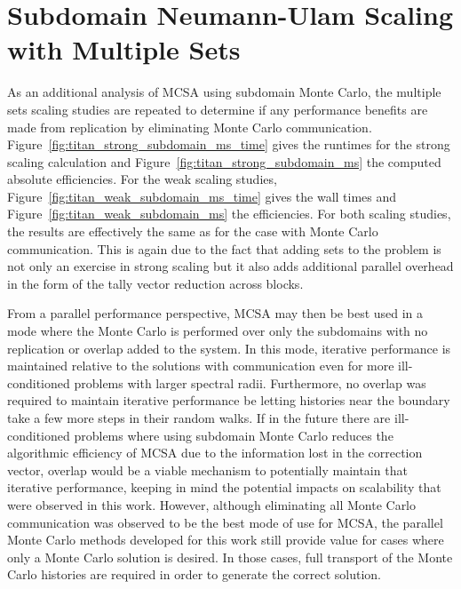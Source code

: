 \chapter{Subdomain Neumann-Ulam Scaling with Multiple Sets}
\label{chap:extra_scaling}
As an additional analysis of MCSA using subdomain Monte Carlo, the multiple
sets scaling studies are repeated to determine if any performance
benefits are made from replication by eliminating Monte Carlo
communication. Figure~\ref{fig:titan_strong_subdomain_ms_time} gives
the runtimes for the strong scaling calculation and
Figure~\ref{fig:titan_strong_subdomain_ms} the computed absolute
efficiencies. For the weak scaling studies,
Figure~\ref{fig:titan_weak_subdomain_ms_time} gives the wall times and
Figure~\ref{fig:titan_weak_subdomain_ms} the efficiencies. For both
scaling studies, the results are effectively the same as for the case
with Monte Carlo communication. This is again due to the fact that
adding sets to the problem is not only an exercise in strong scaling
but it also adds additional parallel overhead in the form of the tally
vector reduction across blocks.

From a parallel performance perspective, MCSA may then be best used in
a mode where the Monte Carlo is performed over only the subdomains
with no replication or overlap added to the system. In this mode,
iterative performance is maintained relative to the solutions with
communication even for more ill-conditioned problems with larger
spectral radii. Furthermore, no overlap was required to maintain
iterative performance be letting histories near the boundary take a
few more steps in their random walks. If in the future there are
ill-conditioned problems where using subdomain Monte Carlo reduces the
algorithmic efficiency of MCSA due to the information lost in the
correction vector, overlap would be a viable mechanism to potentially
maintain that iterative performance, keeping in mind the potential
impacts on scalability that were observed in this work. However,
although eliminating all Monte Carlo communication was observed to be
the best mode of use for MCSA, the parallel Monte Carlo methods
developed for this work still provide value for cases where only a
Monte Carlo solution is desired. In those cases, full transport of the
Monte Carlo histories are required in order to generate the correct
solution.

